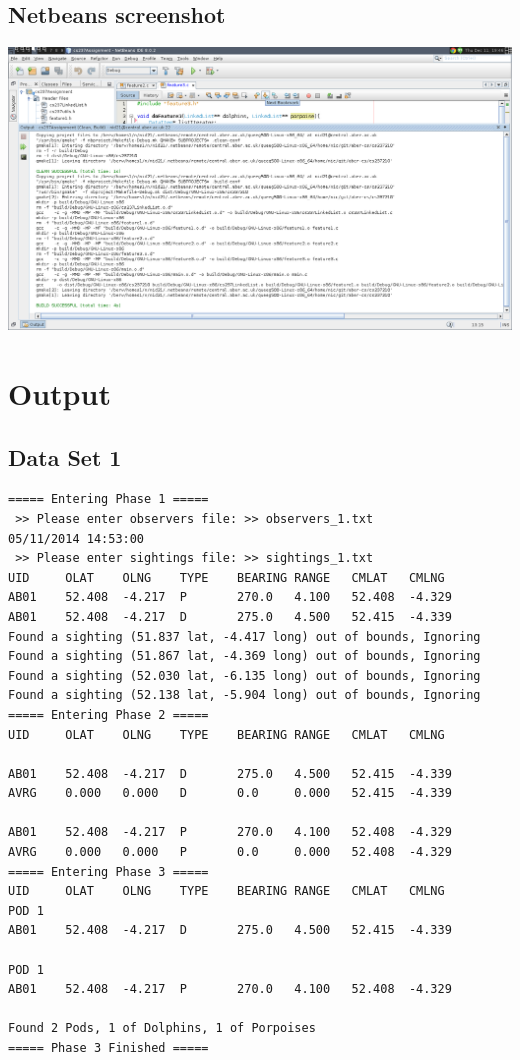 \documentclass[10pt]{article}
\begin{document}
    \newpage
    \begin{landscape}
        \section{Netbeans screenshot}
            \includegraphics[scale=0.45]{netbeansOutput.png}
    \end{landscape}

    \newpage
    \section{Output}
        \subsection{Data Set 1}
            \begin{verbatim}
===== Entering Phase 1 =====
 >> Please enter observers file: >> observers_1.txt
05/11/2014 14:53:00
 >> Please enter sightings file: >> sightings_1.txt
UID     OLAT    OLNG    TYPE    BEARING RANGE   CMLAT   CMLNG
AB01    52.408  -4.217  P       270.0   4.100   52.408  -4.329
AB01    52.408  -4.217  D       275.0   4.500   52.415  -4.339
Found a sighting (51.837 lat, -4.417 long) out of bounds, Ignoring
Found a sighting (51.867 lat, -4.369 long) out of bounds, Ignoring
Found a sighting (52.030 lat, -6.135 long) out of bounds, Ignoring
Found a sighting (52.138 lat, -5.904 long) out of bounds, Ignoring
===== Entering Phase 2 =====
UID     OLAT    OLNG    TYPE    BEARING RANGE   CMLAT   CMLNG

AB01    52.408  -4.217  D       275.0   4.500   52.415  -4.339
AVRG    0.000   0.000   D       0.0     0.000   52.415  -4.339

AB01    52.408  -4.217  P       270.0   4.100   52.408  -4.329
AVRG    0.000   0.000   P       0.0     0.000   52.408  -4.329
===== Entering Phase 3 =====
UID     OLAT    OLNG    TYPE    BEARING RANGE   CMLAT   CMLNG
POD 1
AB01    52.408  -4.217  D       275.0   4.500   52.415  -4.339

POD 1
AB01    52.408  -4.217  P       270.0   4.100   52.408  -4.329

Found 2 Pods, 1 of Dolphins, 1 of Porpoises
===== Phase 3 Finished =====
            \end{verbatim}
\end{document}
